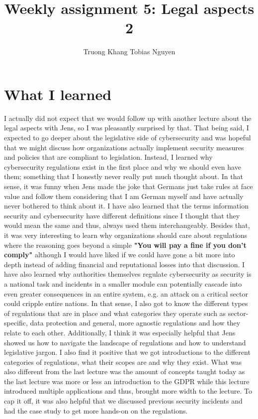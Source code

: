 \documentclass[12pt]{article}
\title{Weekly assignment 5: Legal aspects 2}
\author{Truong Khang Tobias Nguyen}
\date{}
\begin{document}
\maketitle

\section{What I learned}
I actually did not expect that we would follow up with another lecture about the legal aspects with Jens, so I was pleasantly surprised by that. 
\newline
That being said, I expected to go deeper about the legislative side of cybersecurity and was hopeful that we might discuss how organizations actually implement security measures and policies that are compliant to legislation.
\newline
Instead, I learned why cybersecurity regulations exist in the first place and why we should even have them; something that I honestly never really put much thought about. In that sense, it was funny when Jens made the joke that Germans just take rules at face value and follow them considering that I am German myself and have actually never bothered to think about it.
\newline
I have also learned that the terms information security and cybersecurity have different definitions since I thought that they would mean the same and thus, always used them interchangeably. 
\newline
Besides that, it was very interesting to learn why organizations should care about regulations where the reasoning goes beyond a simple \textbf{"You will pay a fine if you don't comply"} although I would have liked if we could have gone a bit more into depth instead of adding financial and reputational losses into that discussion.
\newline
I have also learned why authorities themselves regulate cybersecurity as security is a national task and incidents in a smaller module can potentially cascade into even greater consequences in an entire system, e.g. an attack on a critical sector could cripple entire nations.  In that sense, I also got to know the different types of regulations that are in place and what categories they operate such as sector-specific, data protection and general, more agnostic regulations and how they relate to each other.
\newline
Additionally, I think it was especially helpful that Jens showed us how to navigate the landscape of regulations and how to understand legislative jargon.
\newline
I also find it positive that we got introductions to the different categories of regulations, what their scopes are and why they exist.
\newline
What was also different from the last lecture was the amount of concepts taught today as the last lecture was more or less an introduction to the GDPR while this lecture introduced multiple applications and thus, brought more width to the lecture.
\newline
To cap it off, it was also helpful that we discussed previous security incidents and had the case study to get more hands-on on the regulations. 
\end{document}

